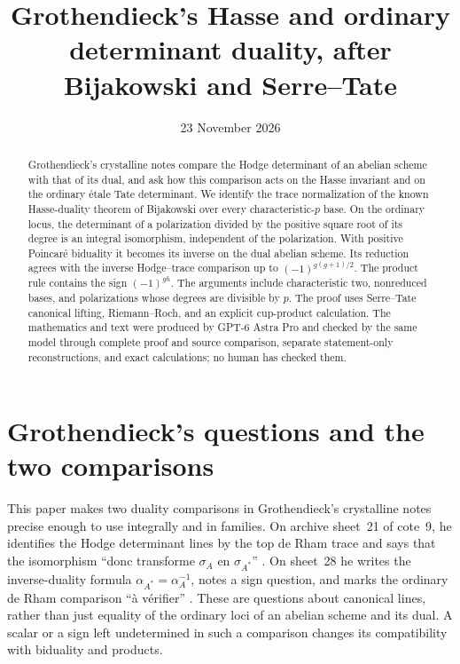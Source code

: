 \documentclass[11pt]{article}
\title{Grothendieck's Hasse and ordinary determinant duality, after Bijakowski and Serre--Tate}
\author{}
\date{23 November 2026}
\theoremstyle{definition}\newtheorem{definition}[theorem]{Definition}
\theoremstyle{remark}\newtheorem{remark}[theorem]{Remark}
\begin{document}
\maketitle
\begin{abstract}
Grothendieck's crystalline notes compare the Hodge determinant of an abelian scheme with that of its dual, and ask how this comparison acts on the Hasse invariant and on the ordinary \'etale Tate determinant. We identify the trace normalization of the known Hasse-duality theorem of Bijakowski over every characteristic-$p$ base. On the ordinary locus, the determinant of a polarization divided by the positive square root of its degree is an integral isomorphism, independent of the polarization. With positive Poincar\'e biduality it becomes its inverse on the dual abelian scheme. Its reduction agrees with the inverse Hodge--trace comparison up to $(-1)^{g(g+1)/2}$. The product rule contains the sign $(-1)^{gh}$. The arguments include characteristic two, nonreduced bases, and polarizations whose degrees are divisible by $p$. The proof uses Serre--Tate canonical lifting, Riemann--Roch, and an explicit cup-product calculation. The mathematics and text were produced by GPT-6 Astra Pro and checked by the same model through complete proof and source comparison, separate statement-only reconstructions, and exact calculations; no human has checked them.
\end{abstract}

\section{Grothendieck's questions and the two comparisons}\label{sec:intro}

This paper makes two duality comparisons in Grothendieck's crystalline notes precise enough to use integrally and in families. On archive sheet~21 of cote~9, he identifies the Hodge determinant lines by the top de Rham trace and says that the isomorphism ``donc transforme $\sigma_A$ en $\sigma_{A^*}$'' \citep[cote~9, sheet~21, PDF image~22]{Grothendieck}. On sheet~28 he writes the inverse-duality formula $\alpha_{A^*}=\alpha_A^{-1}$, notes a sign question, and marks the ordinary de Rham comparison ``\`a v\'erifier'' \citep[cote~9, sheet~28, PDF image~29]{Grothendieck}. These are questions about canonical lines, rather than just equality of the ordinary loci of an abelian scheme and its dual. A scalar or a sign left undetermined in such a comparison changes its compatibility with biduality and products.
\end{document}
